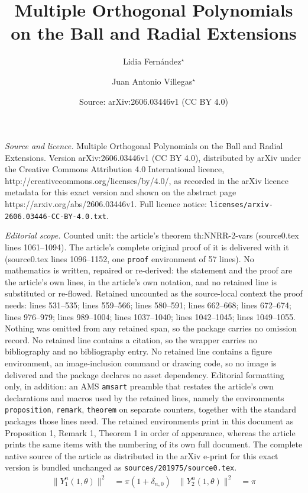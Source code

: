 \documentclass[10pt,a4paper]{amsart}
\title{Multiple Orthogonal Polynomials on the Ball and Radial Extensions}
\author{Lidia Fernández$^\star$ \and Juan Antonio Villegas$^\star$}
\date{Source: arXiv:2606.03446v1 (CC BY 4.0)}
\begin{document}
\maketitle

\noindent\emph{Source and licence.} Multiple Orthogonal Polynomials on the Ball and Radial Extensions. Version arXiv:2606.03446v1 (CC BY 4.0), distributed by arXiv under the Creative Commons Attribution 4.0 International licence, http://creativecommons.org/licenses/by/4.0/, as recorded in the arXiv licence metadata for this exact version and shown on the abstract page https://arxiv.org/abs/2606.03446v1. Full licence notice: \texttt{licenses/arxiv-2606.03446-CC-BY-4.0.txt}.\par\smallskip

\noindent\textit{Editorial scope.} Counted unit: the article's theorem th:NNRR-2-vars (source0.tex lines 1061--1094). The article's complete original proof of it is delivered with it (source0.tex lines 1096--1152, one \texttt{proof} environment of 57 lines). No mathematics is written, repaired or re-derived: the statement and the proof are the article's own lines, in the article's own notation, and no retained line is substituted or re-flowed.  Retained uncounted as the source-local context the proof needs: lines 531--535; lines 559--566; lines 580--591; lines 662--668; lines 672--674; lines 976--979; lines 989--1004; lines 1037--1040; lines 1042--1045; lines 1049--1055.  Nothing was omitted from any retained span, so the package carries no omission record.  No retained line contains a citation, so the wrapper carries no bibliography and no bibliography entry.  No retained line contains a figure environment, an image-inclusion command or drawing code, so no image is delivered and the package declares no asset dependency.  Editorial formatting only, in addition: an AMS \texttt{amsart} preamble that restates the article's own declarations and macros used by the retained lines, namely the environments \texttt{proposition}, \texttt{remark}, \texttt{theorem} on separate counters, together with the standard packages those lines need.  The retained environments print in this document as Proposition 1, Remark 1, Theorem 1 in order of appearance, whereas the article prints the same items with the numbering of its own full document.  The complete native source of the article as distributed in the arXiv e-print for this exact version is bundled unchanged as \texttt{sources/201975/source0.tex}.
    \begin{align}
        \label{eq:norm-harmonics-2-var}
        \|Y_1^{n}(1,\theta)\|^2&= \pi(1+\delta_{n,0}) &
        \|Y_2^{n}(1,\theta)\|^2&= \pi
    \end{align}
\end{document}
